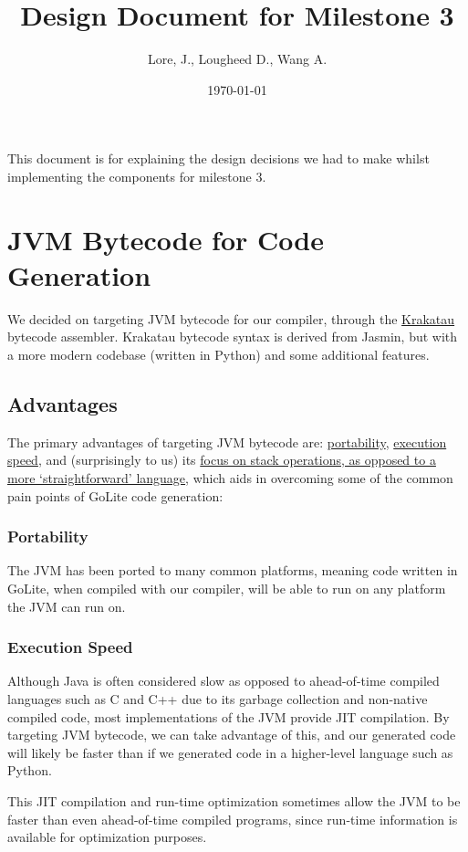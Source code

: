 \documentclass[11pt]{article}
\author{Lore, J., Lougheed D., Wang A.}
\date{\today}
\title{Design Document for Milestone 3}
\begin{document}
\maketitle
\tableofcontents

This document is for explaining the design decisions we had to make
whilst implementing the components for milestone 3.  \newpage
\section{JVM Bytecode for Code Generation}
\label{sec:orgc2daaec}
We decided on targeting JVM bytecode for our compiler, through the
\href{https://github.com/Storyyeller/Krakatau}{Krakatau}
bytecode assembler. Krakatau bytecode syntax is derived from Jasmin, but with
a more modern codebase (written in Python) and some additional features.
\subsection{Advantages}
\label{sec:org6449abb}
The primary advantages of targeting JVM bytecode are:
\hyperref[sec:org7cff5fc]{portability}, \hyperref[sec:orgd3b7f36]{execution speed},
and (surprisingly to us) its \hyperref[sec:org4cbab86]{focus on stack
operations, as opposed to a more `straightforward' language}, which
aids in overcoming some of the common pain points of GoLite code
generation:
\subsubsection{Portability}
\label{sec:org7cff5fc}
The JVM has been ported to many common platforms, meaning code written in
GoLite, when compiled with our compiler, will be able to run on any
platform the JVM can run on.
\subsubsection{Execution Speed}
\label{sec:orgd3b7f36}
Although Java is often considered slow as opposed to ahead-of-time compiled
languages such as C and C++ due to its garbage collection and non-native
compiled code, most implementations of the JVM provide JIT compilation.
By targeting JVM bytecode, we can take advantage of this, and our generated
code will likely be faster than if we generated code in a higher-level
language such as Python.

This JIT compilation and run-time optimization sometimes allow
the JVM to be faster than even ahead-of-time compiled programs, since
run-time information is available for optimization purposes.
\end{document}
